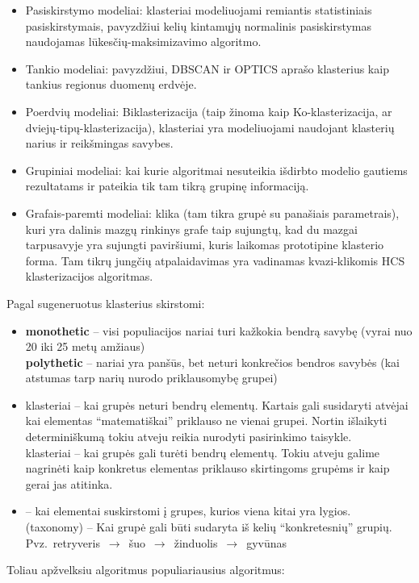 \documentclass{VUMIFInfKursinis}
\begin{document}
\begin{itemize}
		\item Pasiskirstymo modeliai: klasteriai modeliuojami remiantis statistiniais pasiskirstymais, pavyzdžiui kelių kintamųjų normalinis pasiskirstymas naudojamas lūkesčių-maksimizavimo algoritmo.
		\item Tankio modeliai: pavyzdžiui, DBSCAN ir OPTICS aprašo klasterius kaip tankius regionus duomenų erdvėje.
		\item Poerdvių modeliai: Biklasterizacija (taip žinoma kaip Ko-klasterizacija, ar dviejų-tipų-klasterizacija), klasteriai yra modeliuojami naudojant klasterių narius ir reikšmingas savybes.
		\item Grupiniai modeliai: kai kurie algoritmai nesuteikia išdirbto modelio gautiems rezultatams ir pateikia tik tam tikrą grupinę informaciją.
		\item Grafais-paremti modeliai: klika (tam tikra grupė su panašiais parametrais), kuri yra dalinis mazgų rinkinys grafe taip sujungtų, kad du mazgai tarpusavyje yra sujungti paviršiumi, kuris laikomas prototipine klasterio forma. Tam tikrų jungčių atpalaidavimas yra vadinamas kvazi-klikomis HCS klasterizacijos algoritmas.
	\end{itemize}

	Pagal sugeneruotus klasterius skirstomi:
	\begin{itemize}
		\item \textbf{monothetic }– visi populiacijos nariai turi kažkokia bendrą savybę (vyrai nuo 20 iki 25 metų amžiaus)
			\\\textbf{polythetic }– nariai yra panšūs, bet neturi konkrečios bendros savybės (kai atstumas tarp narių nurodo priklausomybę grupei)
		\item {} klasteriai – kai grupės neturi bendrų elementų. Kartais gali susidaryti atvėjai kai elementas “matematiškai” priklauso ne vienai grupei. Nortin išlaikyti determiniškumą tokiu atveju reikia nurodyti pasirinkimo taisykle.
			\\ klasteriai – kai grupės gali turėti bendrų elementų. Tokiu atveju galime nagrinėti kaip konkretus elementas priklauso skirtingoms grupėms ir kaip gerai jas atitinka.
		\item {} – kai elementai suskirstomi į grupes, kurios viena kitai yra lygios.
			\\ (taxonomy) – Kai grupė gali būti sudaryta iš kelių “konkretesnių” grupių. Pvz.\ retryveris $\,\to\,$ šuo $\,\to\,$ žinduolis $\,\to\,$ gyvūnas
	\end{itemize}
	Toliau apžvelksiu algoritmus populiariausius algoritmus:		
\end{document}
